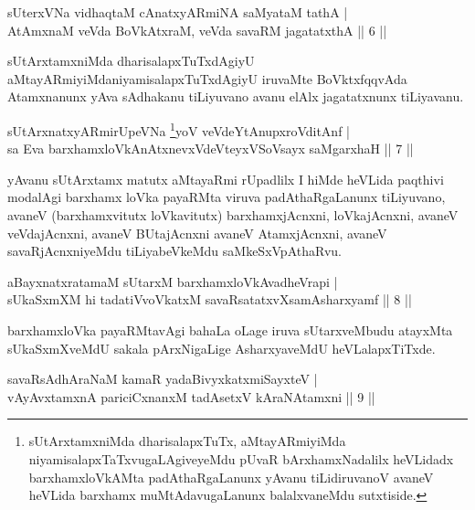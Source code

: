 
\begin{shl}
sUterxVNa vidhaqtaM cAnatxyARmiNA saMyataM tathA |\\
AtAmxnaM veVda BoVkAtxraM, veVda savaRM jagatatxthA \hfill || 6 ||
\end{shl}

\begin{artha}
sUtArxtamxniMda dharisalapxTuTxdAgiyU aMtayARmiyiMda\break niyamisalapxTuTxdAgiyU iruvaMte BoVktxfqqvAda Atamxnanunx yAva sAdhakanu tiLiyuvano avanu elAlx jagatatxnunx tiLiyavanu.
\end{artha}

\begin{shl}
sUtArxnatxyARmirUpeVNa \footnote{sUtArxtamxniMda dharisalapxTuTx, aMtayARmiyiMda niyamisalapxTaTxvugaLAgiveyeMdu pUvaR bArxhamxNadalilx heVLidadx barxhamxloVkAMta padAthaRgaLanunx yAvanu tiLidiruvanoV avaneV heVLida barxhamx muMtAdavugaLanunx balalxvaneMdu sutxtiside.}yoV veVdeYtAnupxroVditAnf |\\
sa Eva barxhamxloVkAnAtxnevxVdeVteyxVSoV\s sayx saMgarxhaH \hfill || 7 ||
\end{shl}

\begin{artha}
yAvanu sUtArxtamx matutx aMtayaRmi rUpadlilx I hiMde heVLida paqthivi modalAgi barxhamx loVka payaRMta viruva padAthaRgaLanunx tiLiyuvano, avaneV (barxhamxvitutx loVkavitutx) barxhamxjAcnxni, loVkajAcnxni, avaneV veVdajAcnxni, avaneV BUtajAcnxni avaneV AtamxjAcnxni, avaneV savaRjAcnxniyeMdu tiLiyabeVkeMdu saMkeSxVpAthaRvu.
\end{artha}

\begin{shl}
aBayxnatxratamaM sUtarxM barxhamxloVkAvadheVrapi |\\
sUkaSxmXM hi tadatiVvoVkatxM savaRsatatxvXsamAsharxyamf \hfill || 8 ||
\end{shl}

\begin{artha}%
barxhamxloVka payaRMtavAgi bahaLa oLage iruva sUtarxveMbudu atayxMta sUkaSxmXveMdU sakala pArxNigaLige AsharxyaveMdU heVLalapxTiTxde.
\end{artha}

\begin{shl}
savaRsAdhAraNaM kamaR yadaBivyxkatxmiSayxteV |\\
vAyAvxtamxnA pariciCxnanxM tadAsetxV kAraNAtamxni \hfill || 9 ||
\end{shl}

